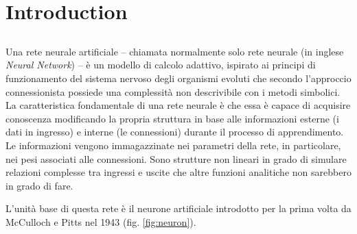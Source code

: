\chapter{Introduction} %
\label{Chapter1} %
\def \path {Figures/C1}
\def \teoria {Figures/teoria}


\section{}
\label{sec:intro}
Una rete neurale artificiale – chiamata normalmente solo rete neurale (in inglese \emph{Neural Network}) – è
un modello di calcolo adattivo, ispirato ai principi di funzionamento del sistema nervoso degli organismi evoluti che secondo l'approccio connessionista \parencite{WConnessionismo} possiede una complessità non descrivibile con i metodi simbolici.  
La caratteristica fondamentale di una rete neurale è che essa è capace di acquisire conoscenza modificando la propria struttura in base alle informazioni esterne (i dati in ingresso) e interne (le connessioni) durante il processo di apprendimento. Le informazioni vengono immagazzinate nei parametri della rete, in particolare, nei pesi associati alle connessioni. 
Sono strutture non lineari in grado di simulare relazioni complesse tra ingressi e uscite che altre funzioni analitiche non sarebbero in grado di fare. 


L'unità base di questa rete è il neurone artificiale introdotto per la prima volta da McCulloch e
Pitts nel 1943 (fig. \ref{fig:neuron}).


